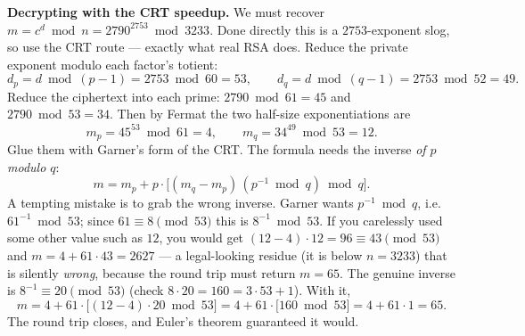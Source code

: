 \textbf{Decrypting with the CRT speedup.} We must recover $m = c^d \bmod n = 2790^{2753} \bmod 3233$.
Done directly this is a $2753$-exponent slog, so use the CRT route --- exactly what real RSA does.
Reduce the private exponent modulo each factor's totient:
\[
  d_p = d \bmod (p-1) = 2753 \bmod 60 = 53, \qquad
  d_q = d \bmod (q-1) = 2753 \bmod 52 = 49.
\]
Reduce the ciphertext into each prime: $2790 \bmod 61 = 45$ and $2790 \bmod 53 = 34$. Then by Fermat
the two half-size exponentiations are
\[
  m_p = 45^{53} \bmod 61 = 4, \qquad m_q = 34^{49} \bmod 53 = 12.
\]
Glue them with Garner's form of the CRT. The formula needs the inverse \emph{of $p$ modulo $q$}:
\[
  m = m_p + p\cdot\big[(m_q - m_p)\,(p^{-1}\bmod q)\bmod q\big].
\]
A tempting mistake is to grab the wrong inverse. Garner wants $p^{-1} \bmod q$, i.e. $61^{-1} \bmod
53$; since $61 \equiv 8 \pmod{53}$ this is $8^{-1} \bmod 53$. If you carelessly used some other
value such as $12$, you would get $(12-4)\cdot 12 = 96 \equiv 43 \pmod{53}$ and
$m = 4 + 61\cdot 43 = 2627$ --- a legal-looking residue (it is below $n = 3233$) that is silently
\emph{wrong}, because the round trip must return $m = 65$. The genuine inverse is $8^{-1} \equiv 20
\pmod{53}$ (check $8\cdot 20 = 160 = 3\cdot 53 + 1$). With it,
\[
  m = 4 + 61\cdot\big[(12 - 4)\cdot 20 \bmod 53\big]
    = 4 + 61\cdot\big[160 \bmod 53\big] = 4 + 61\cdot 1 = 65.
\]
The round trip closes, and Euler's theorem guaranteed it would.

